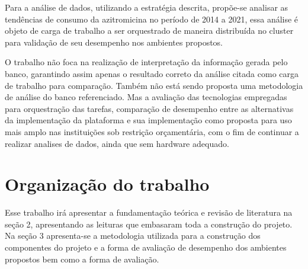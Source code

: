 Para a análise de dados, utilizando a estratégia descrita, propõe-se analisar as tendências de consumo da azitromicina no período de 2014 a 2021, essa análise é objeto de carga de trabalho a ser orquestrado de maneira distribuída no cluster para validação de seu desempenho nos ambientes propostos.

O trabalho não foca na realização de interpretação da informação gerada pelo banco, garantindo assim apenas o resultado correto da análise citada como carga de trabalho para comparação. Também não está sendo proposta uma metodologia de análise do banco referenciado. Mas a avaliação das tecnologias empregadas para orquestração das tarefas, comparação de desempenho entre as alternativas da implementação da plataforma e sua implementação como proposta para uso mais amplo nas instituições sob restrição orçamentária, com o fim de continuar a realizar analises de dados, ainda que sem hardware adequado.


\section{Organização do trabalho}
\label{sec:organizacaoTrabalho}

Esse trabalho irá apresentar a fundamentação teórica e revisão de literatura na seção 2, apresentando as leituras que embasaram toda a construção do projeto. Na seção 3 apresenta-se a  metodologia utilizada para a construção dos componentes do projeto e a forma de avaliação de desempenho dos ambientes propostos bem como a forma de avaliação.